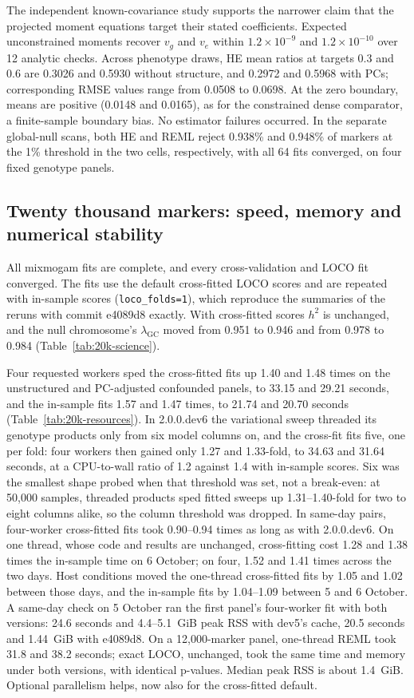 \documentclass[11pt]{article}
\newcommand{\lgc}{\lambda_{\mathrm{GC}}}
\newcommand{\code}[1]{\texttt{#1}}
\begin{document}
The independent known-covariance study supports the narrower claim that
the projected moment equations target their stated coefficients.
Expected unconstrained moments recover $v_g$ and $v_e$ within
$1.2\times10^{-9}$ and $1.2\times10^{-10}$ over 12 analytic checks.
Across phenotype draws, HE mean ratios at targets 0.3 and 0.6 are
0.3026 and 0.5930 without structure, and 0.2972 and 0.5968 with PCs;
corresponding RMSE values range from 0.0508 to 0.0698. At the zero
boundary, means are positive (0.0148 and 0.0165), as for the constrained
dense comparator, a finite-sample boundary bias. No estimator failures occurred.
In the separate global-null scans, both HE and REML reject 0.938\% and
0.948\% of markers at the 1\% threshold in the two cells, respectively,
with all 64 fits converged, on four fixed genotype panels.

\subsection{Twenty thousand markers: speed, memory and numerical stability}
\label{sec:20k-results}

All mixmogam fits are complete, and every cross-validation and LOCO fit
converged. The fits use the default cross-fitted LOCO scores and are
repeated with in-sample scores
(\code{loco\_folds=1}), which reproduce the summaries of the reruns with
commit e4089d8 exactly. With cross-fitted scores $h^2$ is unchanged, and
the null chromosome's $\lgc$ moved from 0.951 to 0.946 and from 0.978 to
0.984 (Table~\ref{tab:20k-science}).

Four requested workers sped the cross-fitted fits up 1.40 and 1.48 times
on the unstructured and PC-adjusted confounded panels, to 33.15 and 29.21
seconds, and the in-sample fits 1.57 and 1.47 times, to 21.74 and 20.70
seconds (Table~\ref{tab:20k-resources}). In 2.0.0.dev6 the variational
sweep threaded its genotype products only from six model columns on, and
the cross-fit fits five, one per fold: four workers then gained only 1.27
and 1.33-fold, to 34.63 and 31.64 seconds, at a CPU-to-wall ratio of 1.2
against 1.4 with in-sample scores. Six was the smallest shape probed when
that threshold was set, not a break-even: at 50,000 samples, threaded
products sped fitted sweeps up 1.31--1.40-fold for two to eight columns
alike, so the column threshold was dropped. In same-day pairs, four-worker
cross-fitted fits took 0.90--0.94 times as long as with 2.0.0.dev6. On one
thread, whose code and results are unchanged, cross-fitting cost 1.28 and
1.38 times the in-sample time on 6 October; on four, 1.52 and 1.41 times
across the two days. Host conditions moved the one-thread cross-fitted
fits by 1.05 and 1.02 between those days, and the in-sample fits by
1.04--1.09 between 5 and 6 October.
A same-day check on 5 October ran the first
panel's four-worker fit with both versions: 24.6 seconds and 4.4--5.1~GiB
peak RSS with dev5's cache, 20.5 seconds and 1.44~GiB with e4089d8. On a
12,000-marker panel, one-thread REML took 31.8 and 38.2 seconds; exact
LOCO, unchanged, took the same time and memory under both versions, with
identical p-values. Median peak RSS is about 1.4~GiB. Optional
parallelism helps, now also for the cross-fitted default.
\end{document}
